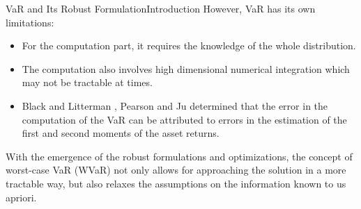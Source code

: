 \documentclass{beamer}
\begin{document}
\begin{frame}{VaR and Its Robust Formulation}{Introduction}
However, VaR has its own limitations:
\begin{itemize}
    \item For the computation part, it requires the knowledge of the whole distribution.
    \item The computation also involves high dimensional numerical integration which may not be tractable at times.
    \item Black and Litterman \cite{black}, Pearson and Ju \cite{ju98} determined that the error in the computation of the VaR can be attributed to errors in the estimation of the first and second moments of the asset returns.
\end{itemize}
With the emergence of the robust formulations and optimizations, the concept of worst-case VaR (WVaR) not only allows for approaching the solution in a more tractable way, but also relaxes the assumptions on the information known to us apriori.


\end{frame}
\end{document}
